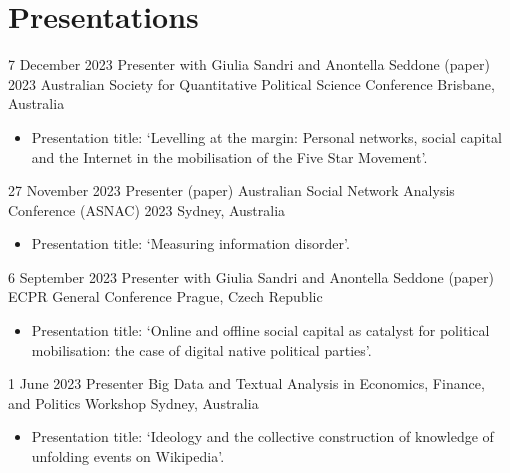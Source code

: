 \documentclass[11pt,a4paper,sans]{moderncv}
\begin{document}








\section{Presentations}

\cventry 
{7 December 2023}
{Presenter with Giulia Sandri and Anontella Seddone (paper)}
{2023 Australian Society for Quantitative Political Science Conference}
{Brisbane, Australia}
{}
      {
      \begin{itemize} %
        \item {Presentation title: `Levelling at the margin: Personal networks, social capital and the Internet in the mobilisation of the Five Star Movement'.}
      \end{itemize}
    }


\cventry 
{27 November 2023}
{Presenter (paper)}
{Australian Social Network Analysis Conference (ASNAC) 2023}
{Sydney, Australia}
{}
      {
      \begin{itemize} %
        \item {Presentation title: `Measuring information disorder'.}
      \end{itemize}
    }

\cventry 
{6 September 2023}
{Presenter with Giulia Sandri and Anontella Seddone (paper)}
{ECPR General Conference}
{Prague, Czech Republic}
{}
      {
      \begin{itemize} %
        \item {Presentation title: `Online and offline social capital as catalyst for political mobilisation: the case of digital native political parties'.}
      \end{itemize}
    }

\cventry 
{1 June 2023}
{Presenter}
{Big Data and Textual Analysis in Economics, Finance, and Politics Workshop}
{Sydney, Australia}
{}
      {
      \begin{itemize} %
        \item {Presentation title: `Ideology and the collective construction of knowledge of unfolding events on Wikipedia'.}
      \end{itemize}
    }
\end{document}
